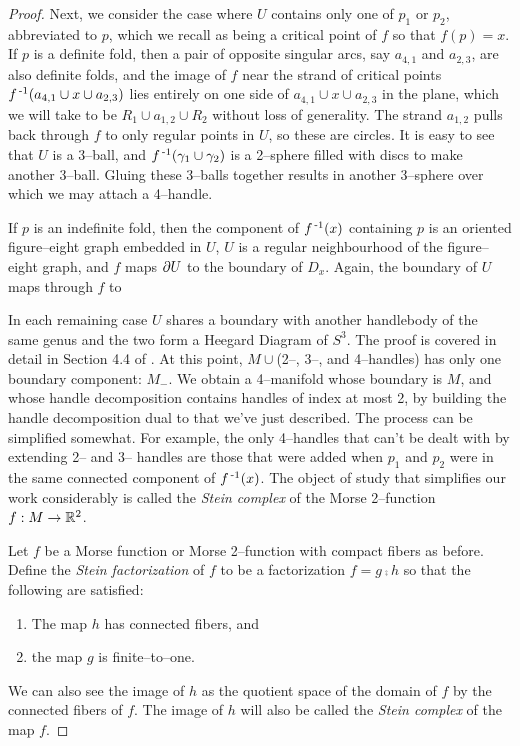 \begin{proof}
Next, we consider the case where $U$ contains only one of $p_1$ or $p_2$, abbreviated to $p$, which we recall as being a critical point of $f$ so that $f(p)=x$.
If $p$ is a definite fold, then a pair of opposite singular arcs, say $a_{4,1}$ and $a_{2,3}$, are also definite folds, and the image of $f$ near the strand of critical points $f^{\,\text{-}1} (a_{4,1}\cup x \cup a_{2,3})$ lies entirely on one side of $a_{4,1}\cup x \cup a_{2,3}$ in the plane, which we will take to be $R_1\cup a_{1,2}\cup R_2$ without loss of generality.
The strand $a_{1,2}$ pulls back through $f$ to only regular points in $U$, so these are circles.
It is easy to see that $U$ is a 3--ball, and $f^{\,\text{-}1} (\gamma_1\cup\gamma_2)$ is a 2--sphere filled with discs to make another 3--ball.
Gluing these 3--balls together results in another 3--sphere over which we may attach a 4--handle.

If $p$ is an indefinite fold, then the component of $f^{\,\text{-}1} (x)$ containing $p$ is an oriented figure--eight graph embedded in $U$, $U$ is a regular neighbourhood of the figure--eight graph, and $f$ maps $\partial U$ to the boundary of $D_x$.
Again, the boundary of $U$ maps through $f$ to 

In each remaining case $U$ shares a boundary with another handlebody of the same genus and the two form a Heegard Diagram of $S^3$.
The proof is covered in detail in Section 4.4 of \cite{CostThur08}.
At this point, $M\cup$(2--, 3--, and 4--handles) has only one boundary component: $M_-$.
We obtain a 4--manifold whose boundary is $M$, and whose handle decomposition contains handles of index at most 2, by building the handle decomposition dual to that we've just described.
The process can be simplified somewhat.
For example, the only 4--handles that can't be dealt with by extending 2-- and 3-- handles are those that were added when $p_1$ and $p_2$ were in the same connected component of $f^{\,\text{-}1} (x)$.
The object of study that simplifies our work considerably is called the \emph{Stein complex} of the Morse 2--function $f:M\to\mathbb{R}^2$.

Let $f$ be a Morse function or Morse 2--function with compact fibers as before.
Define the \emph{Stein factorization} of $f$ to be a factorization $f=g\comp h$ so that the following are satisfied:
\begin{enumerate}
  \item The map $h$ has connected fibers, and
  \item the map $g$ is finite--to--one.
\end{enumerate}
We can also see the image of $h$ as the quotient space of the domain of $f$ by the connected fibers of $f$.
The image of $h$ will also be called the \emph{Stein complex} of the map $f$.


\end{proof}
